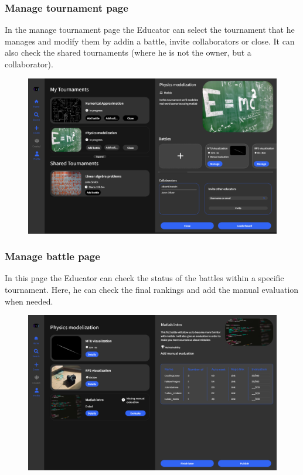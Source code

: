\documentclass[12pt, a4paper]{report}
\begin{document}
        \subsubsection{Manage tournament page} 
        In the manage tournament page the Educator can select the tournament that he manages and modify them by addin a battle, invite collaborators or close. 
        It can also check the shared tournaments (where he is not the owner, but a collaborator). 
        \begin{figure}[H]
            \centering
            \includegraphics[width=0.8\linewidth]{images/manage_tournament.png}
        \end{figure}

        \subsubsection{Manage battle page} 
        In this page the Educator can check the status of the battles within a specific tournament. 
        Here, he can check the final rankings and add the manual evaluation when needed.
        \begin{figure}[H]
            \centering
            \includegraphics[width=0.8\linewidth]{images/manage_battle.png}
        \end{figure}
\end{document}
